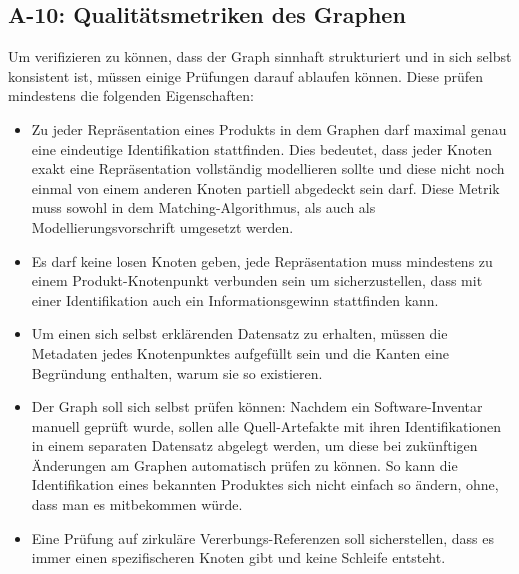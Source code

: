 \subsection{A-10: Qualitätsmetriken des Graphen}\label{subsec:req-graph-inner-consistency}


Um verifizieren zu können, dass der Graph sinnhaft strukturiert und in sich selbst konsistent ist, müssen einige Prüfungen darauf ablaufen können.
Diese prüfen mindestens die folgenden Eigenschaften:

\begin{itemize}
    \item Zu jeder Repräsentation eines Produkts in dem Graphen darf maximal genau eine eindeutige Identifikation stattfinden.
    Dies bedeutet, dass jeder Knoten exakt eine Repräsentation vollständig modellieren sollte und diese nicht noch einmal von einem anderen Knoten partiell abgedeckt sein darf.
    Diese Metrik muss sowohl in dem Matching-Algorithmus, als auch als Modellierungsvorschrift umgesetzt werden.
    \item Es darf keine losen Knoten geben, jede Repräsentation muss mindestens zu einem Produkt-Knotenpunkt verbunden sein um sicherzustellen, dass mit einer Identifikation auch ein Informationsgewinn stattfinden kann.
    \item Um einen sich selbst erklärenden Datensatz zu erhalten, müssen die Metadaten jedes Knotenpunktes aufgefüllt sein und die Kanten eine Begründung enthalten, warum sie so existieren.
    \item Der Graph soll sich selbst prüfen können: Nachdem ein Software-Inventar manuell geprüft wurde, sollen alle Quell-Artefakte mit ihren Identifikationen in einem separaten Datensatz abgelegt werden, um diese bei zukünftigen Änderungen am Graphen automatisch prüfen zu können.
    So kann die Identifikation eines bekannten Produktes sich nicht einfach so ändern, ohne, dass man es mitbekommen würde.
    \item Eine Prüfung auf zirkuläre Vererbungs-Referenzen soll sicherstellen, dass es immer einen spezifischeren Knoten gibt und keine Schleife entsteht.
\end{itemize}


